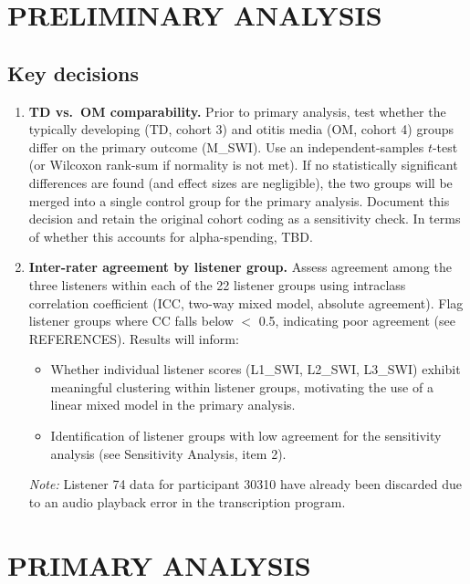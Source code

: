 \documentclass{article}
\begin{document}
\section*{PRELIMINARY ANALYSIS}\label{sec:prelim}
\subsection*{Key decisions}\label{sec:prelim-decisions}

\begin{enumerate}

    \item \textbf{TD vs.\ OM comparability.} Prior to primary analysis, test whether the typically developing (TD, cohort 3) and otitis media (OM, cohort 4) groups differ on the primary outcome (M\_SWI). Use an independent-samples $t$-test (or Wilcoxon rank-sum if normality is not met). If no statistically significant differences are found (and effect sizes are negligible), the two groups will be merged into a single control group for the primary analysis. Document this decision and retain the original cohort coding as a sensitivity check. In terms of whether this accounts for alpha-spending, TBD. 

    \item \textbf{Inter-rater agreement by listener group.} Assess agreement among the three listeners within each of the 22 listener groups using intraclass correlation coefficient (ICC, two-way mixed model, absolute agreement). Flag listener groups where CC falls below $<$ 0.5, indicating poor agreement (see REFERENCES). Results will inform:
    \begin{itemize}
        \item Whether individual listener scores (L1\_SWI, L2\_SWI, L3\_SWI) exhibit meaningful clustering within listener groups, motivating the use of a linear mixed model in the primary analysis.
        \item Identification of listener groups with low agreement for the sensitivity analysis (see Sensitivity Analysis, item 2).
    \end{itemize}
    \textit{Note:} Listener 74 data for participant 30310 have already been discarded due to an audio playback error in the transcription program.

\end{enumerate}

\section*{PRIMARY ANALYSIS}\label{sec:primary}
\end{document}
